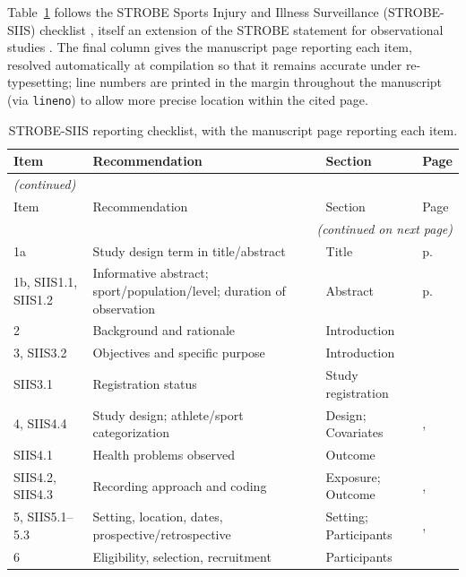 Table~\ref{tab:strobe-siis} follows the STROBE Sports Injury and Illness Surveillance (STROBE-SIIS) checklist \citep{bahr2020strobesiis}, itself an extension of the STROBE statement for observational studies \citep{vonelm2007strobe}. The final column gives the manuscript page reporting each item, resolved automatically at compilation so that it remains accurate under re-typesetting; line numbers are printed in the margin throughout the manuscript (via \texttt{lineno}) to allow more precise location within the cited page.

\begingroup
\footnotesize
\begin{longtable}{p{1.9cm} p{5.9cm} p{2.6cm} p{1.4cm}}
\caption{STROBE-SIIS reporting checklist, with the manuscript page reporting each item.}
\label{tab:strobe-siis}\\
\toprule
Item & Recommendation & Section & Page \\
\midrule
\endfirsthead
\multicolumn{4}{l}{\textit{(continued)}}\\
\toprule
Item & Recommendation & Section & Page \\
\midrule
\endhead
\midrule \multicolumn{4}{r}{\textit{(continued on next page)}}\\
\endfoot
\bottomrule
\endlastfoot
1a & Study design term in title/abstract & Title & p.~\pageref{sec:title} \\
1b, SIIS1.1, SIIS1.2 & Informative abstract; sport/population/level; duration of observation & Abstract & p.~\pageref{sec:abstract} \\
2 & Background and rationale & Introduction & \pageref{sec:introduction} \\
3, SIIS3.2 & Objectives and specific purpose & Introduction & \pageref{sec:introduction} \\
SIIS3.1 & Registration status & Study registration & \pageref{sec:registration} \\
4, SIIS4.4 & Study design; athlete/sport categorization & Design; Covariates & \pageref{sec:design}, \pageref{sec:covariates} \\
SIIS4.1 & Health problems observed & Outcome & \pageref{sec:outcome} \\
SIIS4.2, SIIS4.3 & Recording approach and coding & Exposure; Outcome & \pageref{sec:exposure}, \pageref{sec:outcome} \\
5, SIIS5.1--5.3 & Setting, location, dates, prospective/retrospective & Setting; Participants & \pageref{sec:setting}, \pageref{sec:participants} \\
6 & Eligibility, selection, recruitment & Participants & \pageref{sec:participants} \\

\end{longtable}
